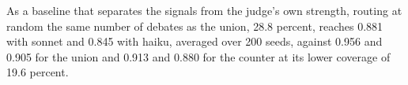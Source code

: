 As a baseline that separates the signals from the judge's own strength,
routing at random the same number of debates as the union, 28.8 percent,
reaches 0.881 with sonnet and 0.845 with haiku, averaged over 200 seeds,
against 0.956 and 0.905 for the union and 0.913 and 0.880 for the counter at
its lower coverage of 19.6 percent.

